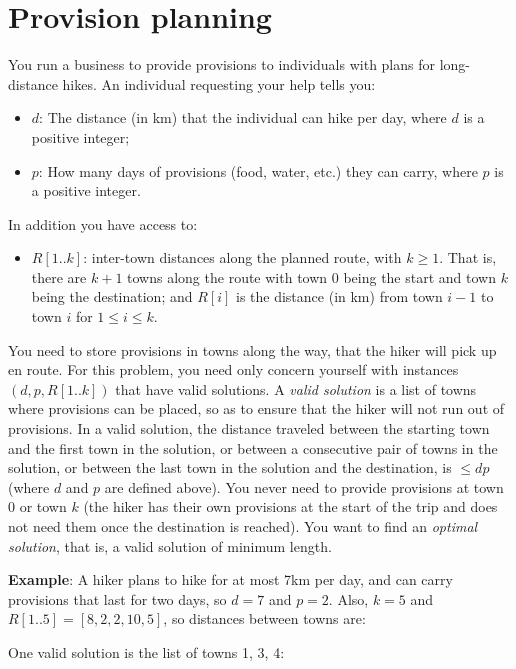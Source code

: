\documentclass[11pt,fleqn]{exam}
\begin{document}
\section{Provision planning}
You run a business to provide provisions to individuals with plans
for long-distance hikes. An individual requesting your help tells you:
\begin{itemize}
\item
$d$: The distance (in km) that the individual can hike per day, where $d$ is a positive integer;
\item
$p$: How many days of provisions (food, water, etc.) they can carry, where $p$ is a positive integer.
\end{itemize}
In addition you have access to:
\begin{itemize}
\item
$R[1..k]$: inter-town distances along the planned route, with $k \ge 1$. That is,
there are $k+1$ towns along the route with town 0 being the start and
town $k$ being the destination; and $R[i]$ is the distance (in km)
from town $i-1$ to town $i$ for $1\le i \le k$.
\end{itemize}
You need to store provisions in towns along the way,
that the hiker will pick up en route.  For this problem, you
need only concern yourself with instances $(d,p,R[1..k])$ that have
valid solutions. A
{\em valid solution} is a list of towns where provisions can
be placed, so as to ensure that the hiker will not run out of
provisions. In a valid solution, the distance traveled between the starting town
and the first town in the solution, or between a consecutive pair of
towns in the solution, or between the last town in the solution and
the destination, is $\le dp$ (where $d$ and $p$ are defined above).
You never need to provide provisions at town 0 or town $k$ (the hiker
has their own provisions at the start of the trip and does not need
them once the destination is reached).  You want to find an {\em
  optimal solution}, that is, a valid solution of minimum length.

\vspace{.1in}
\noindent
{\bf Example}: A hiker plans to
hike for at most 7km per day, and can carry provisions that
last for two days, so $d=7$ and $p=2$.
Also, $k=5$ and $R[1..5] = [8,2,2,10,5]$, so distances between towns are:

\begin{center}
\end{center}
One valid solution is the list of towns 1, 3, 4:
\begin{center}
\end{center}
\end{document}
